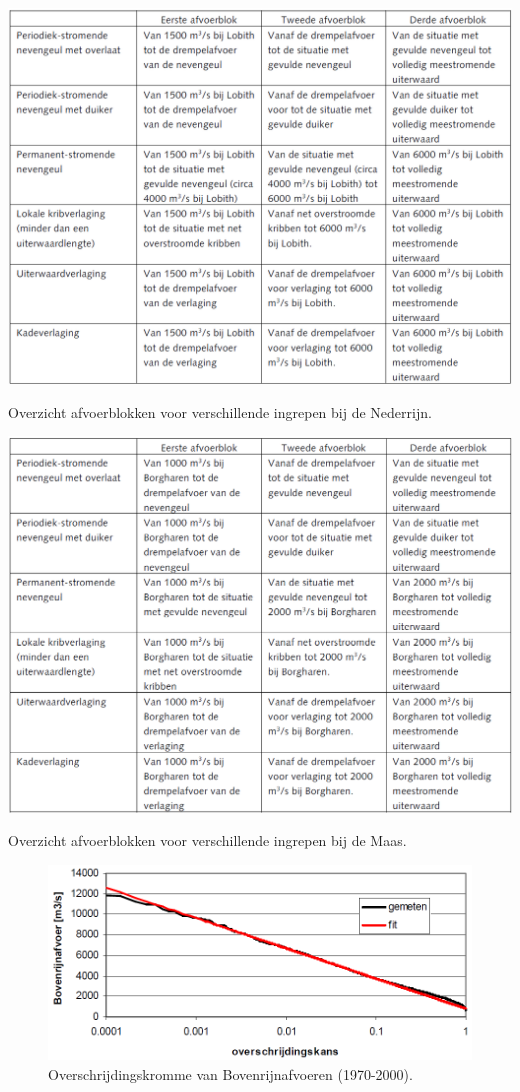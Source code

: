 \begin{table}
\includegraphics[width=\columnwidth]{figures/Tab1b.png}
\caption{Overzicht afvoerblokken voor verschillende ingrepen bij de Nederrijn.}
\label{Tab2}
\end{table}

\begin{table}
\includegraphics[width=\columnwidth]{figures/Tab1c.png}
\caption{Overzicht afvoerblokken voor verschillende ingrepen bij de Maas.}
\label{Tab3}
\end{table}

\begin{figure}
\includegraphics[width=\columnwidth]{figures/Fig3a.png}
\caption{Overschrijdingskromme van Bovenrijnafvoeren (1970-2000).}
\label{Fig3a}
\end{figure}

